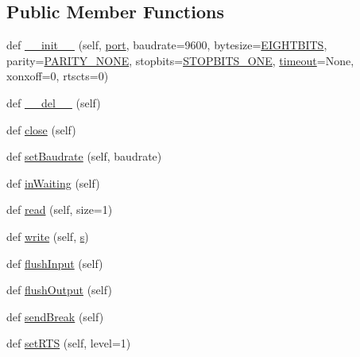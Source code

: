 \subsection*{Public Member Functions}
\begin{DoxyCompactItemize}
\item 
def \hyperlink{classserial_1_1serialwin32_1_1_serial_a86d91fbc1d4ab0a0b14907e530804483}{\+\_\+\+\_\+init\+\_\+\+\_\+} (self, \hyperlink{z1_2i2c_8c_a9f33b3195a1fecb0b114222456959431}{port}, baudrate=9600, bytesize=\hyperlink{namespaceserial_1_1serialwin32_af3a8a7578cf39e9b26901a2341af2ec8}{E\+I\+G\+H\+T\+B\+I\+TS}, parity=\hyperlink{namespaceserial_1_1serialwin32_a3262413e04005207c48aa488bc61f345}{P\+A\+R\+I\+T\+Y\+\_\+\+N\+O\+NE}, stopbits=\hyperlink{namespaceserial_1_1serialwin32_a018c7f180189d6baa881646f60ade0ff}{S\+T\+O\+P\+B\+I\+T\+S\+\_\+\+O\+NE}, \hyperlink{classserial_1_1serialwin32_1_1_serial_ae703b88bd0d51ad74f5a26930a87c4ae}{timeout}=None, xonxoff=0, rtscts=0)
\item 
def \hyperlink{classserial_1_1serialwin32_1_1_serial_abdf0c0c2aef8de41bd60ed991c75ce39}{\+\_\+\+\_\+del\+\_\+\+\_\+} (self)
\item 
def \hyperlink{classserial_1_1serialwin32_1_1_serial_a5c8765f5a0ccd61fbf2788bb7bdc45c0}{close} (self)
\item 
def \hyperlink{classserial_1_1serialwin32_1_1_serial_a6e1935a94c714aca4a43a9f5ad4dbd1c}{set\+Baudrate} (self, baudrate)
\item 
def \hyperlink{classserial_1_1serialwin32_1_1_serial_a60f4b0f33ee7774c4c9b15156a7366cb}{in\+Waiting} (self)
\item 
def \hyperlink{classserial_1_1serialwin32_1_1_serial_aedaa6b7e3bf59da320c07f35195b646d}{read} (self, size=1)
\item 
def \hyperlink{classserial_1_1serialwin32_1_1_serial_a9e5801876829c53e9b76ca22db34dfaa}{write} (self, \hyperlink{namespaceserial_1_1serialwin32_aa695923c609abaebadb4bf849cb40247}{s})
\item 
def \hyperlink{classserial_1_1serialwin32_1_1_serial_a425b9d8f011acc34d64a055c24bf7842}{flush\+Input} (self)
\item 
def \hyperlink{classserial_1_1serialwin32_1_1_serial_aadd9c8148a7d585ec86c7b1f0184f2c0}{flush\+Output} (self)
\item 
def \hyperlink{classserial_1_1serialwin32_1_1_serial_a0052fe42c5f37a474d427296dd88305a}{send\+Break} (self)
\item 
def \hyperlink{classserial_1_1serialwin32_1_1_serial_a06907f6f383bd34161ce7301dba7cd49}{set\+R\+TS} (self, level=1)

\end{DoxyCompactItemize}
